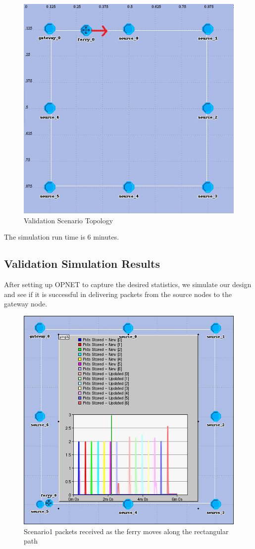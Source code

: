 \begin{figure}[h]
    \centering
    \includegraphics[width=.7\textwidth]{images/scenario1-top1r}
    \caption{Validation Scenario Topology}
    \label{fig:scenario1}
\end{figure}

The simulation run time is 6 minutes.  

\subsection{Validation Simulation Results}
\label{sec:results-validate}


After setting up OPNET to capture the desired statistics, we simulate our design and see if it is successful in delivering packets from the source nodes to the gateway node.

\begin{figure}[h]
    \centering
    \includegraphics[width=.5\textwidth]{images/scenario1-result-received}
    \caption{Scenario1 packets received as the ferry moves along the rectangular path}
    \label{fig:result1-a}
\end{figure}

